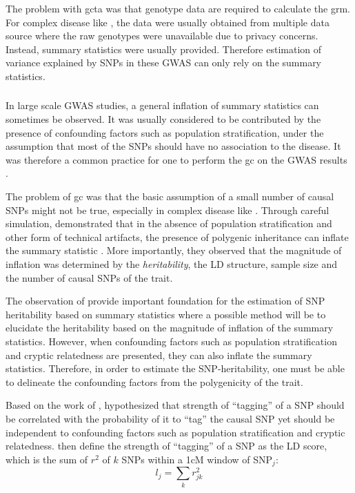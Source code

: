 	The problem with \gls{gcta} was that genotype data are required to calculate the \gls{grm}.
	For complex disease like , the data were usually obtained from multiple data source where the raw genotypes were unavailable due to privacy concerns.
	Instead, summary statistics were usually provided.
	Therefore estimation of variance explained by \glspl{SNP} in these \gls{GWAS} can only rely on the summary statistics. 
	
	\subsubsection{}
	In large scale \gls{GWAS} studies, a general inflation of summary statistics can sometimes be observed.
	It was usually considered to be contributed by the presence of confounding factors such as population stratification, under the assumption that most of the \glspl{SNP} should have no association to the disease.
	It was therefore a common practice for one to perform the \gls{gc} on the \gls{GWAS} results \citep{Zheng2006}.
	
	The problem of \gls{gc} was that the basic assumption of a small number of causal \glspl{SNP} might not be true, especially in complex disease like .
	Through careful simulation, \citet{Yang2011b} demonstrated that in the absence of population stratification and other form of technical artifacts, the presence of polygenic inheritance can inflate the summary statistic \citep{Yang2011b}.
	More importantly, they observed that the magnitude of inflation was determined by the \emph{heritability}, the \gls{LD} structure, sample size and the number of causal \glspl{SNP} of the trait.
	
	The observation of \citet{Yang2011b} provide important foundation for the estimation of \gls{SNP} heritability based on summary statistics where a possible method will be to elucidate the heritability based on the magnitude of inflation of the summary statistics. 
	However, when confounding factors such as population stratification and cryptic relatedness are presented, they can also inflate the summary statistics.
	Therefore, in order to estimate the \gls{SNP}-heritability, one must be able to delineate the confounding factors from the polygenicity of the trait.
	
	Based on the work of \citet{Yang2011b}, \citet{Bulik-Sullivan2015} hypothesized that strength of ``tagging'' of a \gls{SNP} should be correlated with the probability of it to ``tag'' the causal \gls{SNP} yet should be independent to confounding factors such as population stratification and cryptic relatedness.
	\citet{Bulik-Sullivan2015} then define the strength of ``tagging'' of a \gls{SNP} as the \gls{LD} score, which is the sum of $r^2$ of $k$ \glspl{SNP} within a 1cM window of \gls{SNP}$_j$:
	\begin{equation}
	l_j = \sum_kr^2_{jk}
	\label{eq:ldScore}
	\end{equation}
	
